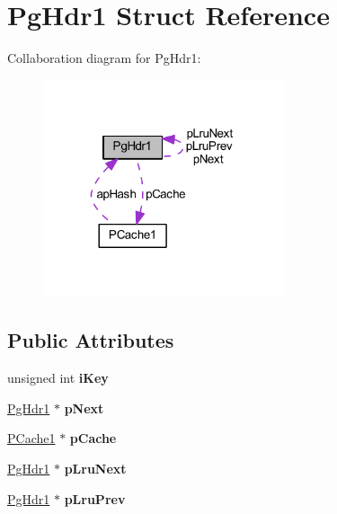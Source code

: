 \hypertarget{struct_pg_hdr1}{\section{Pg\-Hdr1 Struct Reference}
\label{struct_pg_hdr1}
}


Collaboration diagram for Pg\-Hdr1\-:\nopagebreak
\begin{figure}[H]
\begin{center}
\leavevmode
\includegraphics[width=200pt]{struct_pg_hdr1__coll__graph}
\end{center}
\end{figure}
\subsection*{Public Attributes}
\begin{DoxyCompactItemize}
\item 
\hypertarget{struct_pg_hdr1_ad122ef74f5f0137414882aabd111a01b}{unsigned int {\bfseries i\-Key}}\label{struct_pg_hdr1_ad122ef74f5f0137414882aabd111a01b}

\item 
\hypertarget{struct_pg_hdr1_acde43ab0ed0fbba33e526058d9c343b9}{\hyperlink{struct_pg_hdr1}{Pg\-Hdr1} $\ast$ {\bfseries p\-Next}}\label{struct_pg_hdr1_acde43ab0ed0fbba33e526058d9c343b9}

\item 
\hypertarget{struct_pg_hdr1_aa5b23de466773e72e1b6edf07b3a4570}{\hyperlink{struct_p_cache1}{P\-Cache1} $\ast$ {\bfseries p\-Cache}}\label{struct_pg_hdr1_aa5b23de466773e72e1b6edf07b3a4570}

\item 
\hypertarget{struct_pg_hdr1_ae22cfc3a39fe029a8f8fdd70e7ca4055}{\hyperlink{struct_pg_hdr1}{Pg\-Hdr1} $\ast$ {\bfseries p\-Lru\-Next}}\label{struct_pg_hdr1_ae22cfc3a39fe029a8f8fdd70e7ca4055}

\item 
\hypertarget{struct_pg_hdr1_adf220ef63d6ceb782ac87a08aeb1722d}{\hyperlink{struct_pg_hdr1}{Pg\-Hdr1} $\ast$ {\bfseries p\-Lru\-Prev}}\label{struct_pg_hdr1_adf220ef63d6ceb782ac87a08aeb1722d}

\end{DoxyCompactItemize}


